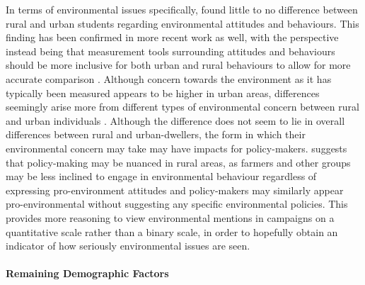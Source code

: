 \documentclass[preprint]{elsarticle} %
\begin{document}
In terms of environmental issues specifically, \citet{bognerEnvironmentalPerceptionRural1997} found little to no difference between rural and urban students regarding environmental attitudes and behaviours. This finding has been confirmed in more recent work as well, with the perspective instead being that measurement tools surrounding attitudes and behaviours should be more inclusive for both urban and rural behaviours to allow for more accurate comparison \citep{huddart-kennedyRuralUrbanDifferencesEnvironmental2009}. Although concern towards the environment as it has typically been measured appears to be higher in urban areas, differences seemingly arise more from different types of environmental concern between rural and urban individuals \citep{deberenguerRuralUrbanDifferencesEnvironmental2005}. Although the difference does not seem to lie in overall differences between rural and urban-dwellers, the form in which their environmental concern may take may have impacts for policy-makers. \citet{freudenburgRuralUrbanDifferencesEnvironmental1991} suggests that policy-making may be nuanced in rural areas, as farmers and other groups may be less inclined to engage in environmental behaviour regardless of expressing pro-environment attitudes and policy-makers may similarly appear pro-environmental without suggesting any specific environmental policies. This provides more reasoning to view environmental mentions in campaigns on a quantitative scale rather than a binary scale, in order to hopefully obtain an indicator of how seriously environmental issues are seen.

\paragraph{Remaining Demographic Factors}
\end{document}
